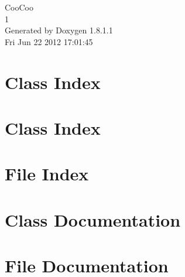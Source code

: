 \documentclass{book}
\begin{document}
\hypersetup{pageanchor=false,citecolor=blue}
\begin{titlepage}
\vspace*{7cm}
\begin{center}
{\Large Coo\-Coo \\[1ex]\large 1 }\\
\vspace*{1cm}
{\large Generated by Doxygen 1.8.1.1}\\
\vspace*{0.5cm}
{\small Fri Jun 22 2012 17:01:45}\\
\end{center}
\end{titlepage}
\clearemptydoublepage
{}
\tableofcontents
\clearemptydoublepage
{}
\hypersetup{pageanchor=true,citecolor=blue}
\chapter{Class Index}

\chapter{Class Index}

\chapter{File Index}

\chapter{Class Documentation}














\chapter{File Documentation}












\printindex
\end{document}

